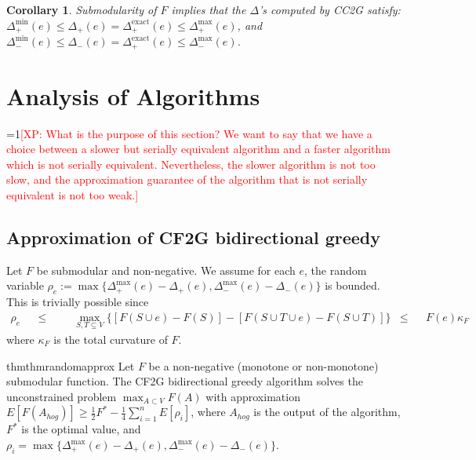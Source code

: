 \documentclass{article} %
\newcommand{\hogwild}{CF2G}
\newcommand{\occ}{CC2G}
\newtheorem{cor}[thm]{Corollary}
\newcommand{\Comments}{1}
\newcommand{\note}[2]{\ifnum\Comments=1\textcolor{#1}{#2}\fi}
\newcommand{\xinghao}[1]{\note{red}{[XP: #1]}}
\begin{document}
\begin{cor}\label{cor:occ:delta_bound} Submodularity of $F$ implies that the $\Delta$'s computed by \occ{} satisfy: $\Delta_+^{\min}(e) \leq \Delta_+(e) = \Delta_+^{\text{exact}}(e) \leq \Delta_+^{\max}(e)$, and $\Delta_-^{\min}(e) \leq \Delta_-(e) = \Delta_+^{\text{exact}}(e) \leq \Delta_-^{\max}(e)$.
\end{cor}
















\section{Analysis of Algorithms \label{sec:analysis}}

\xinghao{What is the purpose of this section?
We want to say that we have a choice between a slower but serially equivalent algorithm and a faster algorithm which is not serially equivalent.
Nevertheless, the slower algorithm is not too slow, and the approximation guarantee of the algorithm that is not serially equivalent is not too weak.}


\subsection{Approximation of \hogwild{} bidirectional greedy \label{sec:analysis:hogwild}}
Let $F$ be submodular and non-negative.
We assume for each $e$, the random variable $\rho_e := \max\{\Delta_+^{\max}(e) - \Delta_+(e), \Delta_-^{\max}(e) - \Delta_-(e)\}$ is bounded.
This is trivially possible since
\begin{align*}
\rho_e
&&\leq&&& \max_{S,T\subseteq V} \{[F(S\cup e) - F(S)] - [F(S \cup T \cup e) - F(S \cup T)]\}
&\leq&& F(e)\kappa_F
\end{align*}
where $\kappa_F$ is the total curvature of $F$.

\begin{restatable}{thm}{thmrandomapprox}\label{thm:randomapprox} Let $F$ be a non-negative (monotone or non-monotone) submodular function.
The \hogwild{} bidirectional greedy algorithm solves the unconstrained problem $\max_{A\subset V} F(A)$ with approximation
$
E[F(A_{hog})] \geq \frac{1}{2}F^* - \frac{1}{4}\sum_{i=1}^n E[\rho_i]$,
where $A_{hog}$ is the output of the algorithm, $F^*$ is the optimal value, and $\rho_i = \max\{\Delta_+^{\max}(e) - \Delta_+(e), \Delta_-^{\max}(e) - \Delta_-(e)\}$.
\end{restatable}
\end{document}
